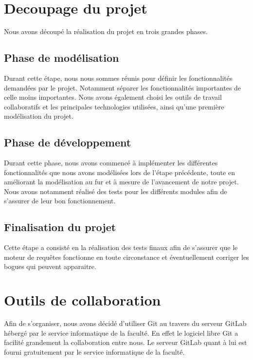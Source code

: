 \documentclass[oneside,13pt,a4paper]{report}
\begin{document}
\section{Decoupage du projet}

Nous avons découpé la réalisation du projet en trois grandes phases.

\subsection{Phase de modélisation}

Durant cette étape, nous nous sommes réunis pour définir les fonctionnalités demandées par le projet. Notamment séparer les fonctionnalités importantes de celle moins importantes. Nous avons également choisi les outils de travail collaboratifs et les principales technologies utilisées, ainsi qu’une première modélisation du projet.

\subsection{Phase de développement}

Durant cette phase, nous avons commencé à implémenter les différentes fonctionnalités que nous avons modélisées lors de l'étape précédente, toute en améliorant la modélisation au fur et à mesure de l'avancement de notre projet. Nous avons notamment réalisé des tests pour les différents modules afin de s'assurer de leur bon fonctionnement.

\subsection{Finalisation du projet}

Cette étape a consisté en la réalisation des tests finaux afin de s'assurer que le moteur de requêtes fonctionne en toute circonstance et éventuellement corriger les bogues qui peuvent apparaitre.

\section{Outils de collaboration}

Afin de s'organiser, nous avons décidé d'utiliser Git au travers du serveur GitLab hébergé par le service informatique de la faculté. En effet le logiciel libre Git a facilité grandement la collaboration entre nous. Le serveur GitLab quant à lui est fourni gratuitement par le service informatique de la faculté.
\end{document}
